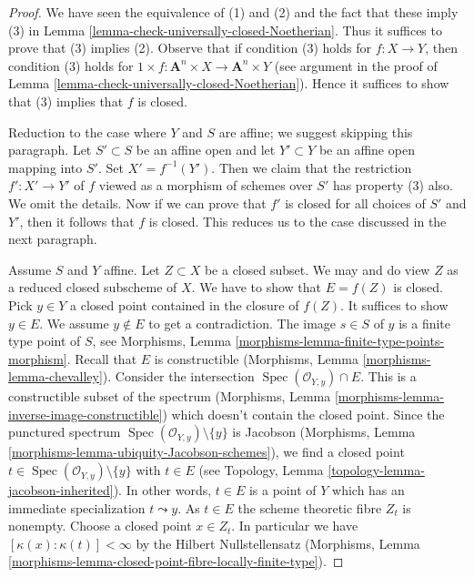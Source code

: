 \documentclass{stacks-project}
\theoremstyle{plain}
\theoremstyle{definition}
\theoremstyle{remark}
\numberwithin{equation}{subsection}
\def\Spec{\mathop{\mathrm{Spec}}}
\begin{document}
\begin{proof}
We have seen the equivalence of (1) and (2) and the
fact that these imply (3) in
Lemma \ref{lemma-check-universally-closed-Noetherian}.
Thus it suffices to prove that (3) implies (2).
Observe that if condition (3) holds for $f : X \to Y$,
then condition (3) holds for
$1 \times f : \mathbf{A}^n \times X \to \mathbf{A}^n \times Y$
(see argument in the proof of
Lemma \ref{lemma-check-universally-closed-Noetherian}).
Hence it suffices to show that (3) implies that $f$ is closed.

\medskip\noindent
Reduction to the case where $Y$ and $S$ are affine; we suggest
skipping this paragraph.
Let $S' \subset S$ be an affine open and let $Y' \subset Y$ be an
affine open mapping into $S'$. Set $X' = f^{-1}(Y')$. Then we
claim that the restriction $f' : X' \to Y'$ of $f$ viewed as a morphism
of schemes over $S'$ has property (3) also. We omit the details.
Now if we can prove that $f'$ is closed for all choices of
$S'$ and $Y'$, then it follows that $f$ is closed. This reduces
us to the case discussed in the next paragraph.

\medskip\noindent
Assume $S$ and $Y$ affine. Let $Z \subset X$ be a closed subset.
We may and do view $Z$ as a reduced closed subscheme of $X$.
We have to show that $E = f(Z)$ is closed. Pick $y \in Y$ a closed point
contained in the closure of $f(Z)$. It suffices to show $y \in E$.
We assume $y \not \in E$ to get a contradiction.
The image $s \in S$ of $y$ is a finite type point of $S$, see
Morphisms, Lemma \ref{morphisms-lemma-finite-type-points-morphism}.
Recall that $E$ is constructible
(Morphisms, Lemma \ref{morphisms-lemma-chevalley}).
Consider the intersection $\Spec(\mathcal{O}_{Y, y}) \cap E$.
This is a constructible subset of the spectrum
(Morphisms, Lemma \ref{morphisms-lemma-inverse-image-constructible})
which doesn't contain the closed point.
Since the punctured spectrum
$\Spec(\mathcal{O}_{Y, y}) \setminus \{y\}$ is Jacobson
(Morphisms, Lemma \ref{morphisms-lemma-ubiquity-Jacobson-schemes}), we find a
closed point $t \in \Spec(\mathcal{O}_{Y, y}) \setminus \{y\}$
with $t \in E$ (see Topology, Lemma \ref{topology-lemma-jacobson-inherited}).
In other words, $t \in E$ is a point of $Y$ which
has an immediate specialization $t \leadsto y$.
As $t \in E$ the scheme theoretic fibre $Z_t$ is nonempty.
Choose a closed point $x \in Z_t$. In particular we have
$[\kappa(x) : \kappa(t)] < \infty$ by the Hilbert Nullstellensatz
(Morphisms, Lemma
\ref{morphisms-lemma-closed-point-fibre-locally-finite-type}).


\end{proof}
\end{document}
